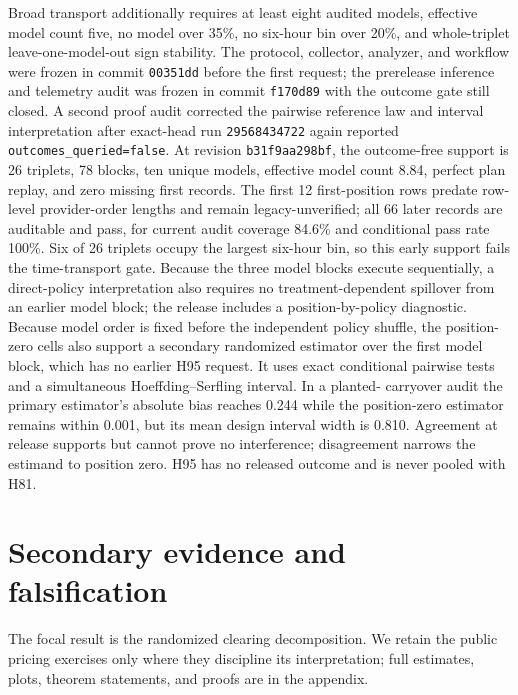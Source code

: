 \documentclass[11pt]{article}
\newcommand{\1}{\mathbf{1}}
\begin{document}
Broad transport additionally requires at least eight audited models, effective
model count five, no model over 35\%, no six-hour bin over 20\%, and whole-triplet
leave-one-model-out sign stability.  The protocol, collector, analyzer, and
workflow were frozen in commit \texttt{00351dd} before the first request; the
prerelease inference and telemetry audit was frozen in commit \texttt{f170d89}
with the outcome gate still closed.  A second proof audit corrected the pairwise
reference law and interval interpretation after exact-head run
\texttt{29568434722} again reported \texttt{outcomes\_queried=false}.  At
revision \texttt{b31f9aa298bf}, the
outcome-free support is 26 triplets, 78 blocks, ten unique models,
effective model count 8.84, perfect plan replay, and zero missing first records.
The first 12 first-position rows predate row-level provider-order lengths and
remain legacy-unverified; all 66 later records are auditable and pass, for
current audit coverage 84.6\% and conditional pass rate 100\%.  Six of 26
triplets occupy the largest six-hour bin, so this early
support fails the time-transport gate.  Because the three model blocks execute
sequentially, a direct-policy interpretation also requires no treatment-dependent
spillover from an earlier model block; the release includes a position-by-policy
diagnostic.  Because model order is fixed before the independent policy shuffle,
the position-zero cells also support a secondary randomized estimator over the
first model block, which has no earlier H95 request.  It uses exact conditional
pairwise tests and a simultaneous Hoeffding--Serfling interval.  In a planted-
carryover audit the primary estimator's absolute bias reaches 0.244 while the
position-zero estimator remains within 0.001, but its mean design interval width
is 0.810.  Agreement at release supports but cannot prove no interference;
disagreement narrows the estimand to position zero.  H95 has no released outcome
and is never pooled with H81.

\section{Secondary evidence and falsification}
\label{sec:secondary}

The focal result is the randomized clearing decomposition.  We retain the public
pricing exercises only where they discipline its interpretation; full estimates,
plots, theorem statements, and proofs are in the appendix.
\end{document}
